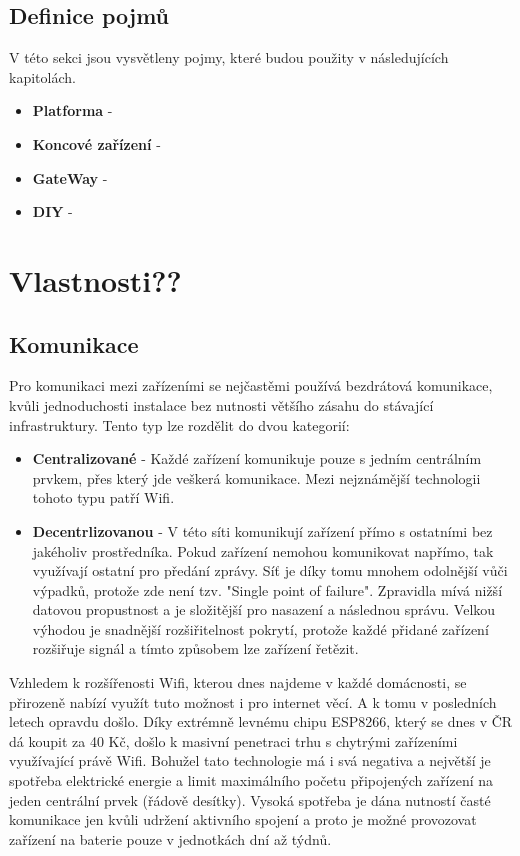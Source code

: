 \documentclass[thesis=B,czech]{FITthesis}[2019/12/23]
\begin{document}
\subsection{Definice pojmů}
V této sekci jsou vysvětleny pojmy, které budou použity v následujících kapitolách.

\begin{itemize}
    \item \textbf{Platforma} -
    \item \textbf{Koncové zařízení} -
    \item \textbf{GateWay} -
    \item \textbf{DIY} -
\end{itemize}

\section{Vlastnosti??}

\subsection{Komunikace}    %
Pro komunikaci mezi zařízeními se nejčastěmi používá bezdrátová komunikace, kvůli jednoduchosti instalace bez nutnosti většího zásahu do stávající infrastruktury. Tento typ lze rozdělit do dvou kategorií:
\begin{itemize}
    \item \textbf{Centralizované} - Každé zařízení komunikuje pouze s jedním centrálním prvkem, přes který jde veškerá komunikace. Mezi nejznámější technologii tohoto typu patří Wifi.
    \item \textbf{Decentrlizovanou} - V této síti komunikují zařízení přímo s ostatními bez jakéholiv prostředníka. Pokud zařízení nemohou komunikovat napřímo, tak využívají ostatní pro předání zprávy. Síť je díky tomu mnohem odolnější vůči výpadků, protože zde není tzv. "Single point of failure". Zpravidla mívá nižší datovou propustnost a je složitější pro nasazení a následnou správu. Velkou výhodou je snadnější rozšiřitelnost pokrytí, protože každé přidané zařízení rozšiřuje signál a tímto způsobem lze zařízení řetězit.
\end{itemize}
Vzhledem k rozšířenosti Wifi, kterou dnes najdeme v každé domácnosti, se přirozeně nabízí využít tuto možnost i pro internet věcí. A k tomu v posledních letech opravdu došlo. Díky extrémně levnému chipu ESP8266, který se dnes v ČR dá koupit za 40 Kč, došlo k masivní penetraci trhu s chytrými zařízeními využívající právě Wifi. Bohužel tato technologie má i svá negativa a největší je spotřeba elektrické energie a limit maximálního početu připojených zařízení na jeden centrální prvek (řádově desítky). Vysoká spotřeba je dána nutností časté komunikace jen kvůli udržení aktivního spojení a proto je možné provozovat zařízení na baterie pouze v jednotkách dní až týdnů.
\end{document}
